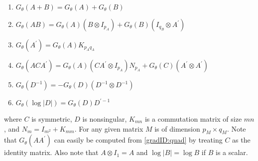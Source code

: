 \documentclass[12pt]{article}
\newcommand{\Gt}{G_\theta}
\begin{document}
	\begin{enumerate}[label=(\alph*)]
	\item \label{gradID:sum} $\Gt(A + B) = \Gt(A) + \Gt(B)$
	\item \label{gradID:mult} $\Gt(A B) = \Gt(A) (B \otimes I_{p_A}) + \Gt(B)(I_{q_B} \otimes A^\prime)$
	\item \label{gradID:trans} $\Gt(A^\prime) = \Gt(A) K_{p_A q_A}$ 
	\item \label{gradID:quad} $\Gt(ACA^\prime) = \Gt(A)(CA^\prime \otimes I_{p_A}) N_{p_A} + \Gt(C)(A^\prime \otimes A^\prime)$
	\item \label{gradID:inv} $\Gt(D^{-1}) = -\Gt(D)(D^{-1} \otimes D^{-1})$ 
	\item \label{gradID:logdet} $\Gt(\log |D|) = \Gt(D) D^{\prime-1}$
	\end{enumerate}
	where $C$ is symmetric, $D$ is nonsingular, $K_{mn}$ is a commutation matrix of size $mn$, and $N_m = I_{m^2} + K_{mm}$. For any given matrix $M$ is of dimension $p_M \times q_M$. Note that $\Gt(AA^\prime)$ can easily be computed from \ref{gradID:quad} by treating $C$ as the identity matrix. Also note that $A \otimes I_1 = A$ and $\log |B| = \log B$ if $B$ is a scalar. 


 

\end{document}
